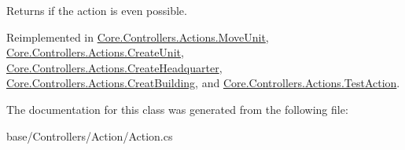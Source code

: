Returns if the action is even possible. 



Reimplemented in \hyperlink{classCore_1_1Controllers_1_1Actions_1_1MoveUnit_a6689af13f9a2f8ff90ad72d2ac327a52}{Core.\-Controllers.\-Actions.\-Move\-Unit}, \hyperlink{classCore_1_1Controllers_1_1Actions_1_1CreateUnit_a30ceafb2aa0fb1b801a8abd659c9d70f}{Core.\-Controllers.\-Actions.\-Create\-Unit}, \hyperlink{classCore_1_1Controllers_1_1Actions_1_1CreateHeadquarter_aae428d8792453bea4aae8dfd9478a1fd}{Core.\-Controllers.\-Actions.\-Create\-Headquarter}, \hyperlink{classCore_1_1Controllers_1_1Actions_1_1CreatBuilding_a10b4bb58784bd5da25abac85727e30b0}{Core.\-Controllers.\-Actions.\-Creat\-Building}, and \hyperlink{classCore_1_1Controllers_1_1Actions_1_1TestAction_a34c402de500bea49dcf438efb421517d}{Core.\-Controllers.\-Actions.\-Test\-Action}.



The documentation for this class was generated from the following file\-:\begin{DoxyCompactItemize}
\item 
base/\-Controllers/\-Action/Action.\-cs\end{DoxyCompactItemize}
